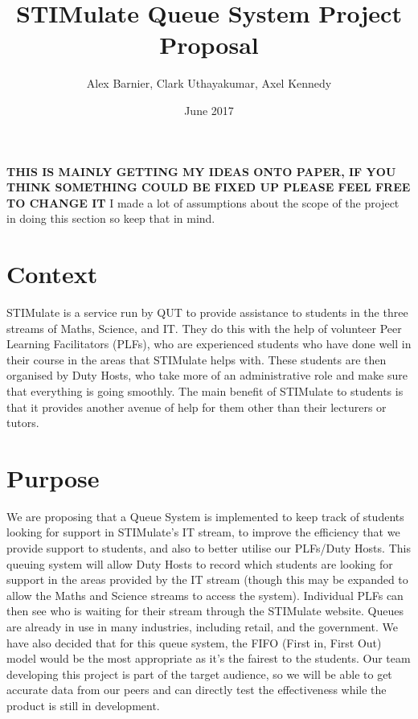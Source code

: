 \documentclass{article}
\begin{document}
	\title{STIMulate Queue System Project Proposal}
	\author{Alex Barnier, Clark Uthayakumar, Axel Kennedy}
	\date{June 2017}
	\maketitle
	
	\textbf{THIS IS MAINLY GETTING MY IDEAS ONTO PAPER, IF YOU THINK SOMETHING COULD BE FIXED UP PLEASE FEEL FREE TO CHANGE IT}
\newline
\newline
I made a lot of assumptions about the scope of the project in doing this section so keep that in mind.
	\section{Context}
STIMulate is a service run by QUT to provide assistance to students in the three streams of Maths, Science, and IT. They do this with the help of volunteer Peer Learning Facilitators (PLFs), who are experienced students who have done well in their course in the areas that STIMulate helps with. These students are then organised by Duty Hosts, who take more of an administrative role and make sure that everything is going smoothly. The main benefit of STIMulate to students is that it provides another avenue of help for them other than their lecturers or tutors.  
	\section{Purpose}
We are proposing that a Queue System is implemented to keep track of students looking for support in STIMulate's IT stream, to improve the efficiency that we provide support to students, and also to better utilise our PLFs/Duty Hosts. This queuing system will allow Duty Hosts to record which students are looking for support in the areas provided by the IT stream (though this may be expanded to allow the Maths and Science streams to access the system).  Individual PLFs can then see who is waiting for their stream through the STIMulate website. 
\newline
\newline
Queues are already in use in many industries, including retail, and the government. We have also decided that for this queue system, the FIFO (First in, First Out) model would be the most appropriate as it’s the fairest to the students. 
\newline
\newline
Our team developing this project is part of the target audience, so we will be able to get accurate data from our peers and can directly test the effectiveness while the product is still in development.
\end{document}
